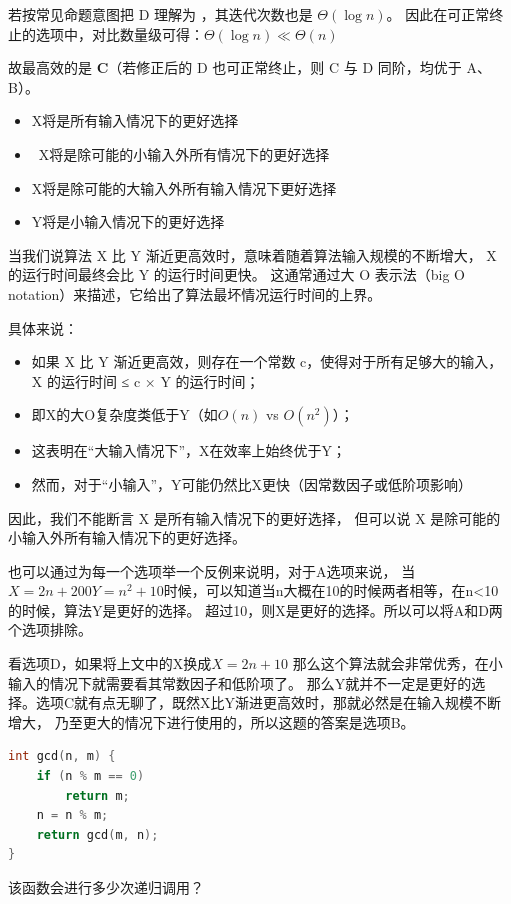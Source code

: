 \documentclass[b5paper,11pt]{article}
\begin{document}
若按常见命题意图把 D 理解为 ，其迭代次数也是 $\Theta(\log n)$。
因此在可正常终止的选项中，对比数量级可得：$\Theta(\log n) \ll \Theta(n)$

故最高效的是 \textbf{C}（若修正后的 D 也可正常终止，则 C 与 D 同阶，均优于 A、B）。

\dhr

\begin{itemize}
  \item [A.] X将是所有输入情况下的更好选择
  \item [B.]\ X将是除可能的小输入外所有情况下的更好选择
  \item [C.] X将是除可能的大输入外所有输入情况下更好选择
  \item [D.] Y将是小输入情况下的更好选择
\end{itemize}

当我们说算法 X 比 Y 渐近更高效时，意味着随着算法输入规模的不断增大，
X 的运行时间最终会比 Y 的运行时间更快。
这通常通过大 O 表示法（big O notation）来描述，它给出了算法最坏情况运行时间的上界。

具体来说：
\begin{itemize}
  \item[-] 如果 X 比 Y 渐近更高效，则存在一个常数 c，使得对于所有足够大的输入，
    X 的运行时间 ≤ c × Y 的运行时间；
  \item[-] 即X的大O复杂度类低于Y（如$O(n)$ vs $O(n^2)$）；
  \item[-] 这表明在“大输入情况下”，X在效率上始终优于Y；
  \item[-] 然而，对于“小输入”，Y可能仍然比X更快（因常数因子或低阶项影响）
\end{itemize}
因此，我们不能断言 X 是所有输入情况下的更好选择，
但可以说 X 是除可能的小输入外所有输入情况下的更好选择。

也可以通过为每一个选项举一个反例来说明，对于A选项来说，
当$X=2n+200 Y=n^2+10$时候，可以知道当n大概在10的时候两者相等，在n<10的时候，算法Y是更好的选择。
超过10，则X是更好的选择。所以可以将A和D两个选项排除。

看选项D，如果将上文中的X换成$X=2n + 10$ 那么这个算法就会非常优秀，在小输入的情况下就需要看其常数因子和低阶项了。
那么Y就并不一定是更好的选择。选项C就有点无聊了，既然X比Y渐进更高效时，那就必然是在输入规模不断增大，
乃至更大的情况下进行使用的，所以这题的答案是选项B。

\dhr

\begin{lstlisting}[language=c]
int gcd(n, m) {
    if (n % m == 0)
        return m;
    n = n % m;
    return gcd(m, n);
}
\end{lstlisting}
该函数会进行多少次递归调用？
\end{document}
